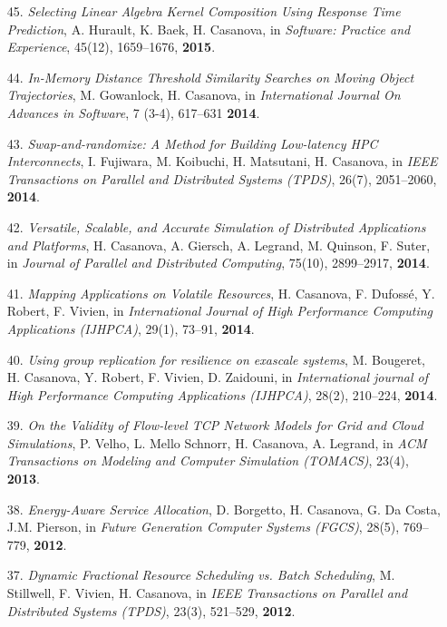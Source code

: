 \begin{enumerate}
\item [45.] {\it Selecting Linear Algebra Kernel Composition Using Response
Time Prediction}, A. Hurault, K. Baek, H. Casanova, in \emph{Software:
Practice and Experience}, 45(12), 1659--1676, {\bf 2015}.

\item [44.] {\it In-Memory Distance Threshold Similarity Searches on Moving
Object Trajectories}, M. Gowanlock, H. Casanova, in \emph{International
Journal On Advances in Software},  7 (3-4), 617--631 {\bf 2014}.

\item [43.] {\it Swap-and-randomize: A Method for Building Low-latency HPC Interconnects}, I. Fujiwara, M. Koibuchi, H. Matsutani, H. Casanova,
    in \emph{IEEE Transactions on Parallel and Distributed Systems (TPDS)}, 26(7),  2051--2060,  {\bf 2014}.

\item [42.] {\it Versatile, Scalable, and Accurate Simulation of Distributed Applications and Platforms},
H. Casanova, A. Giersch, A. Legrand, M. Quinson, F. Suter,
in \emph{Journal of Parallel and Distributed Computing},
75(10), 2899--2917, {\bf 2014}.

\item [41.] {\it Mapping Applications on Volatile Resources},
H. Casanova, F. Dufoss\'e, Y. Robert, F. Vivien,
in \emph{International Journal of High Performance Computing Applications (IJHPCA)}, 29(1), 73--91, {\bf 2014}.

\item[40.] {\it Using group replication for resilience on exascale systems},
M. Bougeret, H. Casanova, Y. Robert, F. Vivien, D. Zaidouni,
in \emph{International journal of High Performance Computing Applications (IJHPCA)},
28(2), 210--224, {\bf 2014}.

\item[39.] {\it On the Validity of Flow-level TCP Network Models for Grid and Cloud Simulations}, P. Velho, L. Mello Schnorr, H. Casanova, A. Legrand,
    in \emph{ACM Transactions on Modeling and Computer Simulation (TOMACS)}, 23(4),
{\bf 2013}.

\item[38.] {\it Energy-Aware Service Allocation}, D. Borgetto, H. Casanova, G. Da Costa, J.M. Pierson, in \emph{Future Generation Computer Systems (FGCS)}, 28(5), 769--779, {\bf 2012}.

\item[37.] {\it Dynamic Fractional Resource Scheduling vs. Batch Scheduling}, M. Stillwell, F. Vivien, H. Casanova, in \emph{IEEE Transactions on Parallel and Distributed Systems (TPDS)}, 23(3), 521--529, {\bf 2012}.


\end{enumerate}
